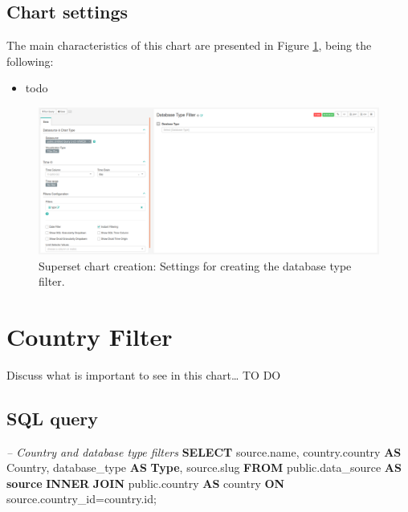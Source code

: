 \documentclass[]{book}
\newenvironment{Shaded}{\begin{snugshade}}{\end{snugshade}}
\newcommand{\KeywordTok}[1]{\textcolor[rgb]{0.13,0.29,0.53}{\textbf{#1}}}
\newcommand{\CommentTok}[1]{\textcolor[rgb]{0.56,0.35,0.01}{\textit{#1}}}
\newcommand{\NormalTok}[1]{#1}
\providecommand{\tightlist}{%
  \setlength{\itemsep}{0pt}\setlength{\parskip}{0pt}}
\begin{document}
\subsection{Chart settings}\label{chart-settings}

The main characteristics of this chart are presented in Figure
\ref{fig:databaseTypeFilter}, being the following:

\begin{itemize}
\tightlist
\item
  todo
\end{itemize}

\begin{figure}
\includegraphics[width=1\linewidth]{images/databaseTypeFilter} \caption{Superset chart creation: Settings for creating the database type filter.}\label{fig:databaseTypeFilter}
\end{figure}

\section{Country Filter}\label{country-filter}

Discuss what is important to see in this chart\ldots{} TO DO

\subsection{SQL query}\label{sql-query}

\begin{Shaded}
\begin{Highlighting}[]
\CommentTok{--  Country and database type filters}
\KeywordTok{SELECT}\NormalTok{ source.name, }
\NormalTok{       country.country }\KeywordTok{AS}\NormalTok{ Country, }
\NormalTok{       database_type }\KeywordTok{AS} \KeywordTok{Type}\NormalTok{,}
\NormalTok{       source.slug}
\KeywordTok{FROM}\NormalTok{ public.data_source }\KeywordTok{AS} \KeywordTok{source} \KeywordTok{INNER} \KeywordTok{JOIN}\NormalTok{ public.country }
  \KeywordTok{AS}\NormalTok{ country }\KeywordTok{ON}\NormalTok{ source.country_id=country.id;}
\end{Highlighting}
\end{Shaded}
\end{document}
